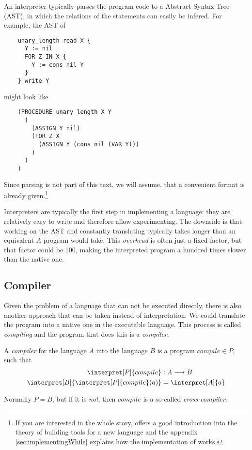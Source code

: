 An interpreter typically parses the program code to a Abstract Syntax Tree 
(AST), in which the relations of the statements can easily be infered. For 
example, the AST of

\begin{verbatim}
	unary_length read X {
	  Y := nil
	  FOR Z IN X {
	    Y := cons nil Y
	  }
	} write Y
\end{verbatim}

might look like

\begin{verbatim}
	(PROCEDURE unary_length X Y
	  (
	    (ASSIGN Y nil)
	    (FOR Z X
	      (ASSIGN Y (cons nil (VAR Y)))
	    )
	  )
	)
\end{verbatim}

Since parsing is not part of this text, we will assume, that a convenient 
format is already given.\footnote{If you are interested in the whole story, 
	\cite{aho2007compilers} offers a good introduction into the theory of
	building tools for a new language and the appendix
	\ref{sec:implementingWhile} explains how the implementation of \WHILE works.}


Interpreters are typically the first step in implementing a language: they 
are relatively easy to write and therefore allow experimenting. The downside 
is that working on the AST and constantly translating typically takes longer 
than an equivalent $A$ program would take. This {\em overhead} is often 
just a fixed factor, but that factor could be 100, making the interpreted program a 
hundred times slower than the native one.

\subsection{Compiler} %
\label{sub:Compiler}
Given the problem of a language that can not be executed directly, there is 
also another approach that can be taken instead of interpretation: We could 
translate the program into a native one in the executable language. This 
process is called {\em compiling} and the program that does this is a {\em
compiler}.

\begin{defn}
	A {\em compiler} for the language $A$ into the language $B$ is a program
	$compile\in P$, such that
	\begin{align*}
		\interpret[P]{compile} &: A \longrightarrow B\\
		\interpret[B]{\interpret[P]{compile}(a)} &= \interpret[A]{a}
	\end{align*}

	Normally $P=B$, but if it is {\em not}, then $compile$ is a so-called {\em
	cross-compiler}.
\end{defn}

